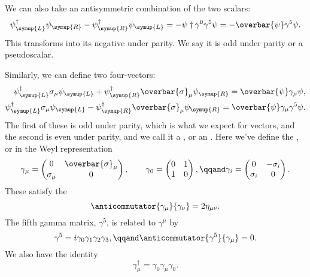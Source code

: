 \documentclass[fleqn]{NotesClass}
\newcommand{\ident}{1}
\newcommand{\minkowskiMetric}{\eta}
\newcommand{\hermit}{\dagger}
\newcommand{\Left}{\symup{L}}
\newcommand{\Right}{\symup{R}}
\newcommand{\diracadjoint}[1]{\overbar{#1}}
\begin{document}
    We can also take an antisymmetric combination of the two scalars:
    \begin{equation}
        \psi_{\Left}^\hermit\psi_{\Right} - \psi_{\Right}^\hermit\psi_{\Left} = -\psi\hermit \gamma^0\gamma^5\psi = -\diracadjoint{\psi}\gamma^5\psi.
    \end{equation}
    This transforms into its negative under parity.
    We say it is odd under parity or a pseudoscalar.
    
    Similarly, we can define two four-vectors:
    \begin{align}
        \psi_{\Left}^\hermit \sigma_{\mu} \psi_{\Left} + \psi_{\Right}^\hermit \overbar{\sigma}_\mu \psi_{\Right} = \diracadjoint{\psi}\gamma_\mu \psi,\\
        \psi_{\Left}^\hermit \sigma_{\mu} \psi_{\Left} - \psi_{\Right}^\hermit \overbar{\sigma}_\mu \psi_{\Right} = \diracadjoint{\psi}\gamma_\mu\gamma^5\psi.
    \end{align}
    The first of these is odd under parity, which is what we expect for vectors, and the second is even under parity, and we call it a , or an .
    Here we've define the , or  in the Weyl representation
    \begin{equation}
        \gamma_\mu = 
        \begin{pmatrix}
            0 & \overbar{\sigma}_\mu\\
            \sigma_\mu & 0
        \end{pmatrix}
        , \qquad \gamma_0 = 
        \begin{pmatrix}
            0 & \ident\\
            \ident & 0
        \end{pmatrix}
        , \qqand \gamma_i = 
        \begin{pmatrix}
            0 & -\sigma_i\\
            \sigma_i & 0
        \end{pmatrix}
        .
    \end{equation}
    These satisfy the 
    \begin{equation}
        \anticommutator{\gamma_\mu}{\gamma_\nu} = 2\minkowskiMetric_{\mu\nu}.
    \end{equation}
    The fifth gamma matrix, \(\gamma^5\), is related to \(\gamma^\mu\) by
    \begin{equation}
        \gamma^5 = i\gamma_0\gamma_1\gamma_2\gamma_3, \qqand\anticommutator{\gamma^5}{\gamma_\mu} = 0.
    \end{equation}
    We also have the identity
    \begin{equation}
        \gamma_\mu^\hermit = \gamma_0\gamma_\mu\gamma_0.
    \end{equation}
\end{document}
